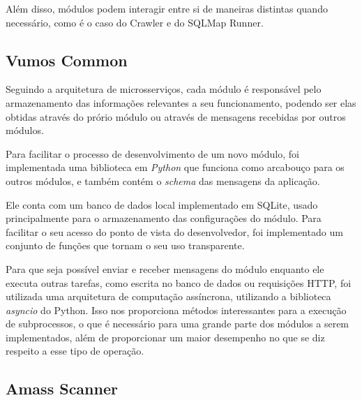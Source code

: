     Além disso, módulos podem interagir entre si de maneiras distintas quando necessário, como é o caso do Crawler e do SQLMap Runner.
    
    \subsection{Vumos Common}
    Seguindo a arquitetura de microsserviços, cada módulo é responsável pelo armazenamento das informações relevantes a seu funcionamento, podendo ser elas obtidas através do prório módulo ou através de mensagens recebidas por outros módulos. 
    
    Para facilitar o processo de desenvolvimento de um novo módulo, foi implementada uma biblioteca em \textit{Python} que funciona como arcabouço para os outros módulos, e também contém o \textit{schema} das mensagens da aplicação.
    
    Ele conta com um banco de dados local implementado em SQLite, usado principalmente para o armazenamento das configurações do módulo. Para facilitar o seu acesso do ponto de vista do desenvolvedor, foi implementado um conjunto de funções que tornam o seu uso transparente.
    
    Para que seja possível enviar e receber mensagens do módulo enquanto ele executa outras tarefas, como escrita no banco de dados ou requisições HTTP, foi utilizada uma arquitetura de computação assíncrona, utilizando a biblioteca \textit{asyncio} do Python. Isso nos proporciona métodos interessantes para a execução de subprocessos, o que é necessário para uma grande parte dos módulos a serem implementados, além de proporcionar um maior desempenho no que se diz respeito a esse tipo de operação. 
    
    \subsection{Amass Scanner}
    
